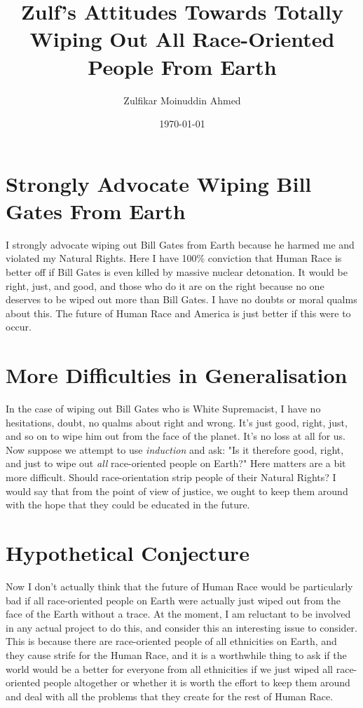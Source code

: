 \documentclass{amsart}
\title{Zulf's Attitudes Towards Totally Wiping Out All Race-Oriented People From Earth}
\author{Zulfikar Moinuddin Ahmed}
\date{\today}
\begin{document}
\maketitle

\section{Strongly Advocate Wiping Bill Gates From Earth}

I strongly advocate wiping out Bill Gates from Earth because he harmed me and violated my Natural Rights.  Here I have 100\% conviction that Human Race is better off if Bill Gates is even killed by massive nuclear detonation.  It would be right, just, and good, and those who do it are on the right because no one deserves to be wiped out more than Bill Gates.  I have no doubts or moral qualms about this.  The future of Human Race and America is just better if this were to occur.

\section{More Difficulties in Generalisation}

In the case of wiping out Bill Gates who is White Supremacist, I have no hesitations, doubt, no qualms about right and wrong.  It's just good, right, just, and so on to wipe him out from the face of the planet.  It's no loss at all for us.  Now suppose we attempt to use {\em induction} and ask:  "Is it therefore good, right, and just to wipe out {\em all} race-oriented people on Earth?"  Here matters are a bit more difficult.  Should race-orientation strip people of their Natural Rights?  I would say that from the point of view of justice, we ought to keep them around with the hope that they could be educated in the future.

\section{Hypothetical Conjecture}

Now I don't actually think that the future of Human Race would be particularly bad if all race-oriented people on Earth were actually just wiped out from the face of the Earth without a trace.  At the moment, I am reluctant to be involved in any actual project to do this, and consider this an interesting issue to consider.  This is because there are race-oriented people of all ethnicities on Earth, and they cause strife for the Human Race, and it is a worthwhile thing to ask if the world would be a better for everyone from all ethnicities if we just wiped all race-oriented people altogether or whether it is worth the effort to keep them around and deal with all the problems that they create for the rest of Human Race.
\end{document}
